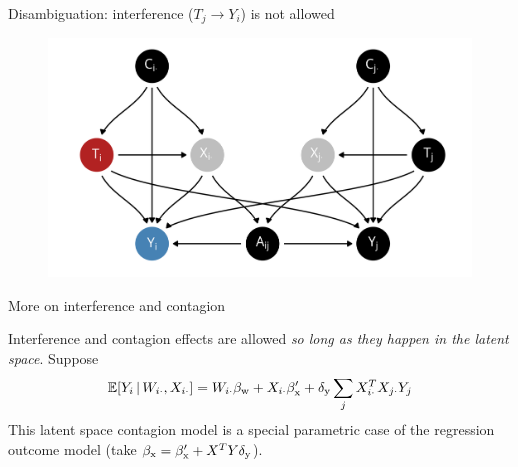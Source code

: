 \documentclass[aspectratio=169]{beamer}
\theoremstyle{remark}
\begin{document}
\begin{frame}{Disambiguation: interference ($T_j \to Y_i$) is not allowed}

    \centering

    \begin{figure}
        \includegraphics[scale=0.7]{figures/dags/homophily-mediating-interference-peer.png}
        \label{fig:interference}
    \end{figure}

\end{frame}

\begin{frame}{More on interference and contagion}

    Interference and contagion effects are allowed \emph{so long as they happen in the latent space}. Suppose
    \begin{align*}
        \E[\W_{i \cdot}, \X_{i \cdot}]{Y_i}
        = \W_{i \cdot} \betaw + \X_{i \cdot} \beta'_\text{x} + \delta_\text{y} \sum_{j} \X_{i \cdot}^T \X_{j \cdot} Y_j
    \end{align*}
    This latent space contagion model is a special parametric case of the regression outcome model (take $\beta_\text{x} = \beta'_\text{x} + X^T Y \delta_\text{y}$).

\end{frame}
\end{document}
